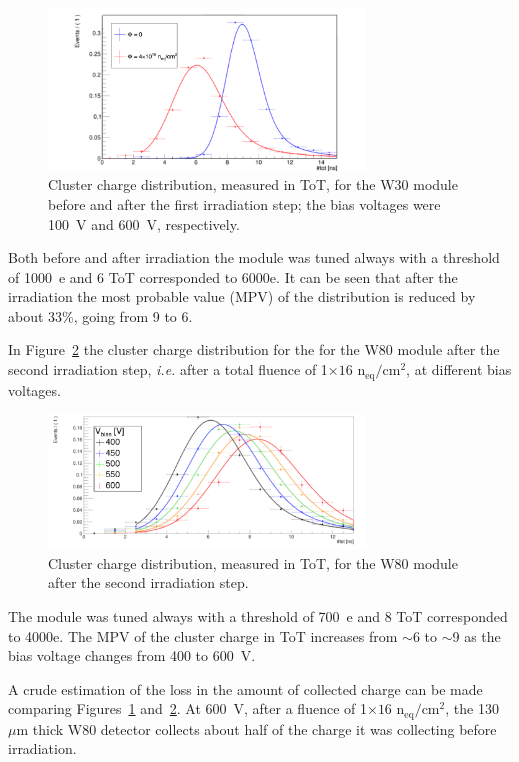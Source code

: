 \begin{figure}[!htpb]
\centering
\includegraphics[width=0.75\textwidth]{CCE_4e15_W30.pdf}
\caption{\label{fig:IrrCCE}Cluster charge distribution, measured in ToT,  for the W30 module before and after the first irradiation 
step; the bias voltages were 100~V and 600~V, respectively.}
\end{figure}

Both before and after irradiation the module was tuned always with a threshold of 1000~e and 6 ToT corresponded to 6000e. 
It can be seen that after the irradiation the most probable value (MPV) of the distribution is reduced 
by about 33\%, going from 9 to 6.

In Figure~\ref{fig:new_mpv_bias} the  cluster charge distribution for the for the W80 module  after the second irradiation 
step, {\it i.e.} after a total fluence of 1$\times{16}$ n$_\text{eq}/\text{cm}^2$, at different bias voltages. 
\begin{figure}[!htpb]
\centering
\includegraphics[width=0.75\textwidth]{new_mpv_bias.pdf}
\caption{\label{fig:new_mpv_bias}Cluster charge distribution, measured in ToT,  for the W80 module  after the second irradiation 
step.}
\end{figure}

The module was tuned always with a threshold of 700~e and 8 ToT corresponded to 4000e. 
The MPV of the cluster charge in ToT increases from $\sim$6 to $\sim$9 as the bias voltage
 changes from 400 to 600~V. 
 
 A crude estimation of the loss in the amount of collected charge 
 can be made comparing Figures~\ref{fig:IrrCCE} and~\ref{fig:new_mpv_bias}. At 600~V, after 
 a fluence of 1$\times{16}$ n$_\text{eq}/\text{cm}^2$, the 130~$\mu$m thick W80 detector 
 collects about half of the charge it was collecting before irradiation.
 
